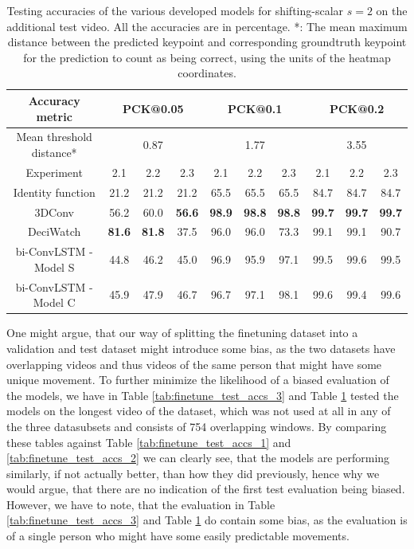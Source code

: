 \documentclass[./main.tex]{subfiles}
\begin{document}
\begin{table}[htbp]
    \begin{tabular}{c||ccc|ccc|ccc}
        \hline
        Accuracy metric & \multicolumn{3}{c}{PCK@0.05} & \multicolumn{3}{c}{PCK@0.1} & \multicolumn{3}{c}{PCK@0.2} \\
        \hline
        Mean threshold distance* & \multicolumn{3}{c}{0.87} & \multicolumn{3}{c}{1.77} & \multicolumn{3}{c}{3.55} \\
        \hline
        Experiment & 2.1 & 2.2 & 2.3 & 2.1 & 2.2 & 2.3 & 2.1 & 2.2 & 2.3 \\
        \hline
        \hline
        Identity function & 21.2 & 21.2 & 21.2 & 65.5 & 65.5 & 65.5 & 84.7 & 84.7 & 84.7 \\
        3DConv & 56.2 & 60.0 & \textbf{56.6} & \textbf{98.9} & \textbf{98.8} & \textbf{98.8} & \textbf{99.7} & \textbf{99.7} & \textbf{99.7} \\
        DeciWatch & \textbf{81.6} & \textbf{81.8} & 37.5 & 96.0 & 96.0 & 73.3 & 99.1 & 99.1 & 90.7 \\
        bi-ConvLSTM - Model S & 44.8 & 46.2 & 45.0 & 96.9 & 95.9 & 97.1 & 99.5 & 99.6 & 99.5 \\
        bi-ConvLSTM - Model C & 45.9 & 47.9 & 46.7 & 96.7 & 97.1 & 98.1 & 99.6 & 99.4 & 99.6 \\
        \hline
    \end{tabular}
    \caption{Testing accuracies of the various developed models for shifting-scalar $s = 2$ on the additional test video. All the accuracies are in percentage. *: The mean maximum distance between the predicted keypoint and corresponding groundtruth keypoint for the prediction to count as being correct, using the units of the heatmap coordinates.}
    \label{tab:finetune_test_accs_4}
\end{table}

\noindent One might argue, that our way of splitting the finetuning dataset into a validation and test dataset might introduce some bias, as the two datasets have overlapping videos and thus videos of the same person that might have some unique movement. To further minimize the likelihood of a biased evaluation of the models, we have in Table \ref{tab:finetune_test_accs_3} and Table \ref{tab:finetune_test_accs_4} tested the models on the longest video of the dataset, which was not used at all in any of the three datasubsets and consists of 754 overlapping windows. By comparing these tables against Table \ref{tab:finetune_test_accs_1} and \ref{tab:finetune_test_accs_2} we can clearly see, that the models are performing similarly, if not actually better, than how they did previously, hence why we would argue, that there are no indication of the first test evaluation being biased. However, we have to note, that the evaluation in Table \ref{tab:finetune_test_accs_3} and Table \ref{tab:finetune_test_accs_4} do contain some bias, as the evaluation is of a single person who might have some easily predictable movements.
\end{document}
